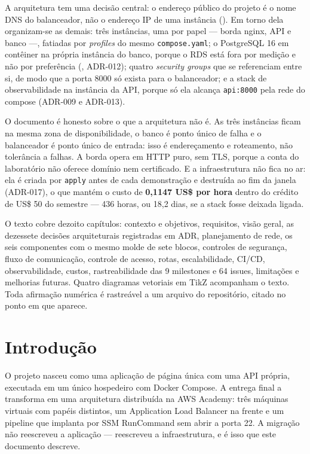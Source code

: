 \documentclass[11pt,a4paper]{article}
\begin{document}
A arquitetura tem uma decisão central: o endereço público do projeto é o nome DNS do balanceador,
não o endereço IP de uma instância (). Em torno dela organizam-se as demais:
três instâncias, uma por papel --- borda nginx, API e banco ---, fatiadas por \emph{profiles} do
mesmo \texttt{compose.yaml}; o PostgreSQL 16 em contêiner na própria instância do banco, porque o
RDS está fora por medição e não por preferência (, ADR-012);
quatro \emph{security groups} que se referenciam entre si, de modo que a porta 8000 só exista para
o balanceador; e a stack de observabilidade na instância da API, porque só ela alcança
\texttt{api:8000} pela rede do compose (ADR-009 e ADR-013).

O documento é honesto sobre o que a arquitetura não é. As três instâncias ficam na mesma zona de
disponibilidade, o banco é ponto único de falha e o balanceador é ponto único de entrada: isso é
endereçamento e roteamento, não tolerância a falhas. A borda opera em HTTP puro, sem TLS, porque a
conta do laboratório não oferece domínio nem certificado. E a infraestrutura não fica no ar: ela é
criada por \texttt{apply} antes de cada demonstração e destruída ao fim da janela (ADR-017), o que
mantém o custo de \textbf{0,1147 US\$ por hora} dentro do crédito de US\$ 50 do semestre ---
436 horas, ou 18,2 dias, se a stack fosse deixada ligada.

O texto cobre dezoito capítulos: contexto e objetivos, requisitos, visão geral, as dezessete
decisões arquiteturais registradas em ADR, planejamento de rede, os seis componentes com o mesmo
molde de sete blocos, controles de segurança, fluxo de comunicação, controle de acesso, rotas,
escalabilidade, CI/CD, observabilidade, custos, rastreabilidade das 9 milestones e 64 issues,
limitações e melhorias futuras. Quatro diagramas vetoriais em TikZ acompanham o texto. Toda
afirmação numérica é rastreável a um arquivo do repositório, citado no ponto em que aparece.

\clearpage
{\small\tableofcontents}
\clearpage

\section{Introdução}

O projeto nasceu como uma aplicação de página única com uma API própria, executada em um único
hospedeiro com Docker Compose. A entrega final a transforma em uma arquitetura distribuída na AWS
Academy: três máquinas virtuais com papéis distintos, um Application Load Balancer na frente e um
pipeline que implanta por SSM RunCommand sem abrir a porta 22. A migração não reescreveu a
aplicação --- reescreveu a infraestrutura, e é isso que este documento descreve.
\end{document}
